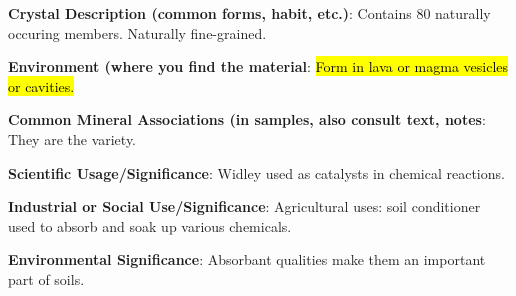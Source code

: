 \documentclass[10pt]{article}
\begin{document}
\begin{framed}
  \textbf{Crystal Description (common forms, habit, etc.)}: Contains 80 naturally occuring members. Naturally fine-grained. 
\end{framed}

\begin{framed}
  \textbf{Environment (where you find the material}: \hl{Form in lava or magma vesicles or cavities.}
\end{framed}

\begin{framed}
  \textbf{Common Mineral Associations (in samples, also consult text, notes}: They are the variety.
\end{framed}

\begin{framed}
  \textbf{Scientific Usage/Significance}: Widley used as catalysts in chemical reactions.
\end{framed}

\begin{framed}
  \textbf{Industrial or Social Use/Significance}: Agricultural uses: soil conditioner used to absorb and soak up various chemicals.
\end{framed}

\begin{framed}
  \textbf{Environmental Significance}: Absorbant qualities make them an important part of soils.
\end{framed}

\end{document}

